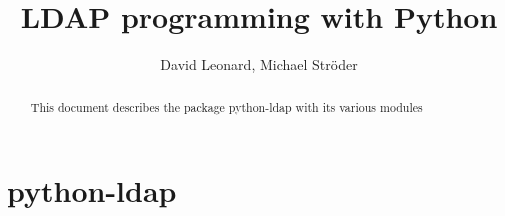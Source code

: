 \documentclass{manual}
\title{LDAP programming with Python}
\author{David Leonard, Michael Str\"oder}
\begin{document}
\maketitle

\begin{abstract}
\noindent
This document describes the package python-ldap with its various modules
\end{abstract}

\tableofcontents

\chapter{ python-ldap }







\renewcommand{\indexname}{Index}
\end{document}
